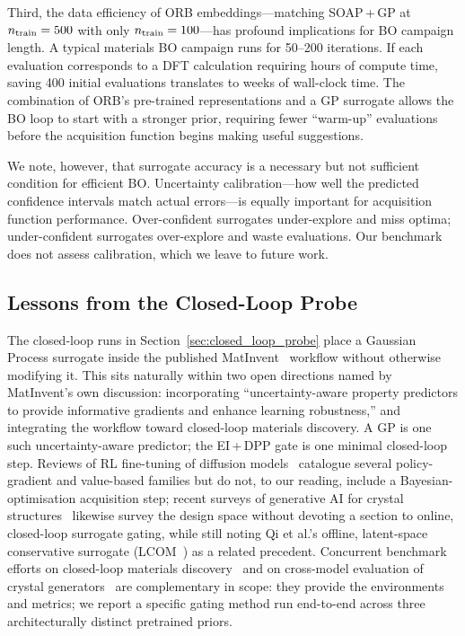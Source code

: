 Third, the data efficiency of ORB embeddings---matching SOAP\,+\,GP at $n_{\text{train}} = 500$ with only $n_{\text{train}} = 100$---has profound implications for BO campaign length.
A typical materials BO campaign runs for 50--200 iterations.
If each evaluation corresponds to a DFT calculation requiring hours of compute time, saving 400 initial evaluations translates to weeks of wall-clock time.
The combination of ORB's pre-trained representations and a GP surrogate allows the BO loop to start with a stronger prior, requiring fewer ``warm-up'' evaluations before the acquisition function begins making useful suggestions.

We note, however, that surrogate accuracy is a necessary but not sufficient condition for efficient BO.
Uncertainty calibration---how well the predicted confidence intervals match actual errors---is equally important for acquisition function performance.
Over-confident surrogates under-explore and miss optima; under-confident surrogates over-explore and waste evaluations.
Our benchmark does not assess calibration, which we leave to future work.

\FloatBarrier
\subsection{Lessons from the Closed-Loop Probe}
\label{sec:diffusion_lessons}

The closed-loop runs in Section~\ref{sec:closed_loop_probe} place a Gaussian Process surrogate inside the published MatInvent~\cite{chen2025matinvent} workflow without otherwise modifying it.
This sits naturally within two open directions named by MatInvent's own discussion: incorporating ``uncertainty-aware property predictors to provide informative gradients and enhance learning robustness,'' and integrating the workflow toward closed-loop materials discovery.
A GP is one such uncertainty-aware predictor; the EI\,+\,DPP gate is one minimal closed-loop step.
Reviews of RL fine-tuning of diffusion models~\cite{uehara2024rldiffusion} catalogue several policy-gradient and value-based families but do not, to our reading, include a Bayesian-optimisation acquisition step; recent surveys of generative AI for crystal structures~\cite{generative_review_2025} likewise survey the design space without devoting a section to online, closed-loop surrogate gating, while still noting Qi et al.'s offline, latent-space conservative surrogate (LCOM~\cite{qi2023lcom}) as a related precedent.
Concurrent benchmark efforts on closed-loop materials discovery~\cite{made_benchmark} and on cross-model evaluation of crystal generators~\cite{lematbench2025} are complementary in scope: they provide the environments and metrics; we report a specific gating method run end-to-end across three architecturally distinct pretrained priors.

